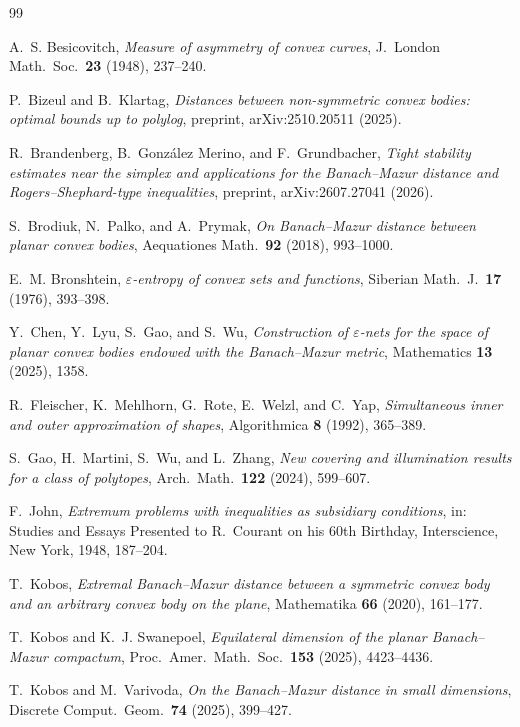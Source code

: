 \documentclass[11pt]{amsart}
\theoremstyle{definition}
\theoremstyle{remark}
\begin{document}
\begin{thebibliography}{99}

A.~S. Besicovitch, \emph{Measure of asymmetry of convex curves}, J.\ London Math.\ Soc.\ \textbf{23} (1948), 237--240.

P.~Bizeul and B.~Klartag, \emph{Distances between non-symmetric convex bodies: optimal bounds up to polylog},
preprint, arXiv:2510.20511 (2025).

R.~Brandenberg, B.~Gonz\'alez Merino, and F.~Grundbacher, \emph{Tight stability estimates near the simplex and
applications for the Banach--Mazur distance and Rogers--Shephard-type inequalities}, preprint, arXiv:2607.27041 (2026).

S.~Brodiuk, N.~Palko, and A.~Prymak, \emph{On Banach--Mazur distance between planar convex bodies},
Aequationes Math.\ \textbf{92} (2018), 993--1000.

E.~M. Bronshtein, \emph{$\varepsilon$-entropy of convex sets and functions}, Siberian Math.\ J.\ \textbf{17} (1976), 393--398.

Y.~Chen, Y.~Lyu, S.~Gao, and S.~Wu, \emph{Construction of $\varepsilon$-nets for the space of planar convex bodies endowed
with the Banach--Mazur metric}, Mathematics \textbf{13} (2025), 1358.

R.~Fleischer, K.~Mehlhorn, G.~Rote, E.~Welzl, and C.~Yap, \emph{Simultaneous inner and outer approximation of shapes},
Algorithmica \textbf{8} (1992), 365--389.

S.~Gao, H.~Martini, S.~Wu, and L.~Zhang, \emph{New covering and illumination results for a class of polytopes},
Arch.\ Math.\ \textbf{122} (2024), 599--607.

F.~John, \emph{Extremum problems with inequalities as subsidiary conditions}, in: Studies and Essays Presented to
R.~Courant on his 60th Birthday, Interscience, New York, 1948, 187--204.

T.~Kobos, \emph{Extremal Banach--Mazur distance between a symmetric convex body and an arbitrary convex body on the plane},
Mathematika \textbf{66} (2020), 161--177.

T.~Kobos and K.~J. Swanepoel, \emph{Equilateral dimension of the planar Banach--Mazur compactum},
Proc.\ Amer.\ Math.\ Soc.\ \textbf{153} (2025), 4423--4436.

T.~Kobos and M.~Varivoda, \emph{On the Banach--Mazur distance in small dimensions}, Discrete Comput.\ Geom.\ \textbf{74}
(2025), 399--427.


\end{thebibliography}
\end{document}
